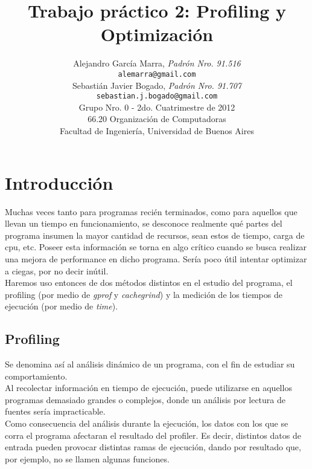 \documentclass[a4paper,10pt]{article}
\title{		\textbf{Trabajo pr\'actico 2: Profiling y Optimizaci\'on }}
\author{	Alejandro Garc\'ia Marra, \textit{Padr\'on Nro. 91.516}                     \\
            \texttt{ alemarra@gmail.com }                                              \\
            Sebasti\'an Javier Bogado, \textit{Padr\'on Nro. 91.707}                     \\
            \texttt{ sebastian.j.bogado@gmail.com }                                              \\
            \normalsize{Grupo Nro. 0 - 2do. Cuatrimestre de 2012}                       \\
            \normalsize{66.20 Organizaci\'on de Computadoras}                             \\
            \normalsize{Facultad de Ingenier\'ia, Universidad de Buenos Aires}            \\
       }
\date{}
\begin{document}
\maketitle

\thispagestyle{empty}

\begin{abstract}

\end{abstract}

\newpage
\section{Introducci\'on}

Muchas veces tanto para programas reci\'en terminados, como para aquellos que llevan un tiempo en funcionamiento, se desconoce realmente qu\'e partes del programa insumen la mayor cantidad de recursos, sean estos de tiempo, carga de cpu, etc.
Poseer esta informaci\'on se torna en algo cr\'itico cuando se busca realizar una mejora de performance en dicho programa. Ser\'ia poco \'util intentar optimizar a ciegas, por no decir in\'util.\\
Haremos uso entonces de dos m\'etodos distintos en el estudio del programa, el profiling (por medio de \textit{gprof} y \textit{cachegrind}) y la medici\'on de los tiempos de ejecuci\'on (por medio de \textit{time}). 

\subsection{Profiling}

	Se denomina as\'i al an\'alisis din\'amico de un programa, con el fin de estudiar su comportamiento.\\
	Al recolectar informaci\'on en tiempo de ejecuci\'on, puede utilizarse en aquellos programas demasiado grandes o complejos, donde un an\'alisis
 por lectura de fuentes ser\'ia impracticable.\\
	Como consecuencia del an\'alisis durante la ejecuci\'on, los datos con los que se corra el programa afectaran el resultado del profiler. 
 Es decir, distintos datos de entrada pueden provocar distintas ramas de ejecuci\'on, dando por resultado que, por ejemplo, no se llamen algunas funciones.
\end{document}
